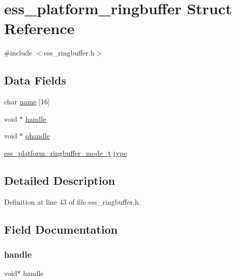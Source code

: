 \hypertarget{structess__platform__ringbuffer}{}\section{ess\+\_\+platform\+\_\+ringbuffer Struct Reference}
\label{structess__platform__ringbuffer}


{\ttfamily \#include $<$ess\+\_\+ringbuffer.\+h$>$}

\subsection*{Data Fields}
\begin{DoxyCompactItemize}
\item 
char \hyperlink{structess__platform__ringbuffer_acd328517a6cf718155c2e6e22b671ca9}{name} \mbox{[}16\mbox{]}
\item 
void $\ast$ \hyperlink{structess__platform__ringbuffer_a81011b79683fab64ce3aff71114f8fdd}{handle}
\item 
void $\ast$ \hyperlink{structess__platform__ringbuffer_a011a9cee6c81e61319318a9a5776db28}{qhandle}
\item 
\hyperlink{ess__ringbuffer_8h_a80a1652a42f77e9a51f3e45c7da84396}{ess\+\_\+platform\+\_\+ringbuffer\+\_\+mode\+\_\+t} \hyperlink{structess__platform__ringbuffer_a6d72e7e7d09fd9b2363d51f2e6c408f5}{type}
\end{DoxyCompactItemize}


\subsection{Detailed Description}


Definition at line 43 of file ess\+\_\+ringbuffer.\+h.



\subsection{Field Documentation}
\mbox{\label{structess__platform__ringbuffer_a81011b79683fab64ce3aff71114f8fdd}} 
\subsubsection{\texorpdfstring{handle}{handle}}
{\footnotesize\ttfamily void$\ast$ handle}



